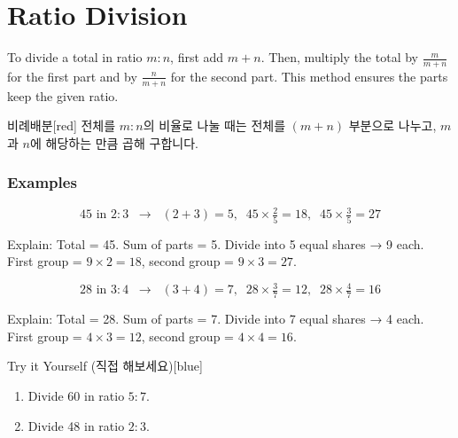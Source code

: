 \documentclass[12pt]{book}
\begin{document}
  \twosidedpaper
  \section{Ratio Division}
  
  To divide a total in ratio $m:n$, first add $m+n$.  
  Then, multiply the total by $\tfrac{m}{m+n}$ for the first part  
  and by $\tfrac{n}{m+n}$ for the second part.  
  This method ensures the parts keep the given ratio.
  
  
  \begin{flexbox}{비례배분}[red]
  전체를 $m:n$의 비율로 나눌 때는 전체를 $(m+n)$ 부분으로 나누고,  
  $m$과 $n$에 해당하는 만큼 곱해 구합니다.
  \end{flexbox}
  
  \subsubsection*{Examples}
  
  \[
  45 \text{ in } 2:3 \;\;\rightarrow\;\; (2+3)=5,\;\; 
  45\times\tfrac{2}{5}=18,\;\; 45\times\tfrac{3}{5}=27
  \]
  
  Explain: Total = 45. Sum of parts = 5.  
  Divide into 5 equal shares → 9 each.  
  First group = $9\times2=18$, second group = $9\times3=27$.
  
  
  
  \[
  28 \text{ in } 3:4 \;\;\rightarrow\;\; (3+4)=7,\;\; 
  28\times\tfrac{3}{7}=12,\;\; 28\times\tfrac{4}{7}=16
  \]
  
  Explain: Total = 28. Sum of parts = 7.  
  Divide into 7 equal shares → 4 each.  
  First group = $4\times3=12$, second group = $4\times4=16$.
  
  \begin{flexbox}{Try it Yourself (직접 해보세요)}[blue]
  \begin{enumerate}
    \item Divide 60 in ratio $5:7$. \vspace*{20pt}
    \item Divide 48 in ratio $2:3$. \vspace*{20pt}
  \end{enumerate}
  \end{flexbox}
  
\end{document}
